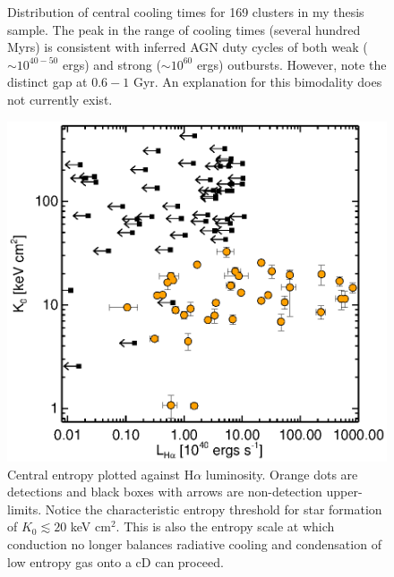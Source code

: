 \documentclass[11pt]{article}
\begin{document}
\begin{figure}[t]
\begin{minipage}[t]{0.5\linewidth}
        \caption{\small Distribution of central cooling times for 169
        clusters in my thesis sample. The peak in the range of cooling
        times (several hundred Myrs) is consistent with inferred AGN
        duty cycles of both weak ($\sim 10^{40-50}$ ergs) and strong ($\sim
        10^{60}$ ergs) outbursts. However, note the distinct gap at $0.6-1$
        Gyr. An explanation for this bimodality does not currently exist.}
        \label{fig:tcool}
    \end{minipage}
    \hspace{0.1cm}
    \begin{minipage}[t]{0.5\linewidth}
        \centering
        \includegraphics*[width=\textwidth, trim=28mm 8mm 30mm 10mm, clip]{ha}
        \caption{\small Central entropy plotted against H$\alpha$
        luminosity. Orange dots are detections and black boxes with
        arrows are non-detection upper-limits. Notice the characteristic entropy threshold for star
        formation of $K_0 \lesssim 20$ keV cm$^2$. This is also the entropy scale at
        which conduction no longer balances radiative cooling and condensation
        of low entropy gas onto a cD can proceed.}
        \label{fig:ha}
    \end{minipage}
    \hspace{0.1in}
    \begin{minipage}[t]{0.5\linewidth}
        \centering

\end{minipage}
\end{figure}
\end{document}
